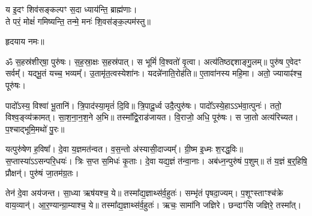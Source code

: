 \begin{center}






य इ॒दꣳ शिव॑सङ्कल्पꣳ स॒दा ध्याय॑न्ति॒ ब्राह्म॑णाः।\\
ते परं॒ मोक्षं॑ गमिष्यन्ति॒ तन्मे॒ मनः॑ शि॒वस॑ङ्क॒ल्पम॑स्तु॥

हृदयाय नमः॥
\end{center}
{\small\closesection}

ॐ स॒हस्र॑शीर्‌षा॒ पुरु॑षः। स॒ह॒स्रा॒क्षः स॒हस्र॑पात्। स भूमिं॑ वि॒श्वतो॑ वृ॒त्वा। अत्य॑तिष्ठद्दशाङ्गु॒लम्॥ पुरु॑ष ए॒वेदꣳ सर्वम्᳚। यद्भू॒तं यच्च॒ भव्यम्᳚। उ॒तामृ॑त॒त्वस्येशा॑नः। यदन्ने॑नाति॒रोह॑ति॥ ए॒तावा॑नस्य महि॒मा। अतो॒ ज्यायाꣴ॑श्च॒ पूरु॑षः।

पादो᳚ऽस्य॒ विश्वा॑ भू॒तानि॑। त्रि॒पाद॑स्या॒मृतं॑ दि॒वि॥ त्रि॒पादू॒र्ध्व उदै॒त्पुरु॑षः। पादो᳚ऽस्ये॒हाऽऽभ॑वा॒त्पुनः॑। ततो॒ विश्व॒ङ्व्य॑क्रामत्। सा॒श॒ना॒न॒श॒ने अ॒भि॥ तस्मा᳚द्वि॒राड॑जायत। वि॒राजो॒ अधि॒ पूरु॑षः। स जा॒तो अत्य॑रिच्यत। प॒श्चाद्भूमि॒मथो॑ पु॒रः॥

यत्पुरु॑षेण ह॒विषा᳚। दे॒वा य॒ज्ञमत॑न्वत। व॒स॒न्तो अ॑स्यासी॒दाज्यम्᳚। ग्री॒ष्म इ॒ध्मः श॒रद्ध॒विः॥ स॒प्तास्या॑ऽऽ\-सन्परि॒धयः॑। त्रिः स॒प्त स॒मिधः॑ कृ॒ताः। दे॒वा यद्य॒ज्ञं त॑न्वा॒नाः। अब॑ध्न॒न्पुरु॑षं प॒शुम्॥ तं य॒ज्ञं ब॒र्॒‌हिषि॒ प्रौक्षन्॑। पुरु॑षं जा॒तम॑ग्र॒तः।

तेन॑ दे॒वा अय॑जन्त। सा॒ध्या ऋष॑यश्च॒ ये॥ तस्मा᳚द्य॒ज्ञाथ्स॑र्व॒\-हुतः॑। सम्भृ॑तं पृषदा॒ज्यम्। प॒शूꣳस्ताꣳश्च॑क्रे वाय॒व्यान्॑। आ॒र॒ण्यान्ग्रा॒म्याश्च॒ ये॥ तस्मा᳚द्य॒ज्ञाथ्स॑र्व॒हुतः॑। ऋचः॒ सामा॑नि जज्ञिरे। छन्दाꣳ॑सि जज्ञिरे॒ तस्मा᳚त्।

